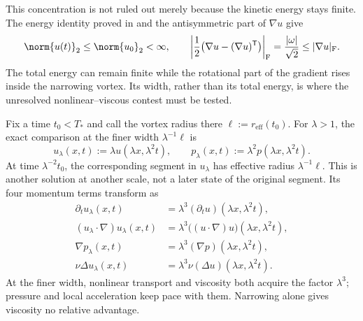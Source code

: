 This concentration is not ruled out merely because the kinetic energy stays finite. The energy identity proved in  and the antisymmetric part of \(\nabla u\) give
\[
  \norm{u(t)}_2
  \leq
  \norm{u_0}_2
  <\infty,
  \qquad
  \left|\frac12\bigl(\nabla u-(\nabla u)^{\mathsf T}\bigr)\right|_{\mathrm F}
  =
  \frac{|\omega|}{\sqrt2}
  \leq
  |\nabla u|_{\mathrm F}.
\]
The total energy can remain finite while the rotational part of the gradient rises inside the narrowing vortex. Its width, rather than its total energy, is where the unresolved nonlinear--viscous contest must be tested.


Fix a time \(t_0<T_*\) and call the vortex radius there \(\ell:=r_{\mathrm{eff}}(t_0)\). For \(\lambda>1\), the exact \NavierStokes{} comparison at the finer width \(\lambda^{-1}\ell\) is
\[
  u_\lambda(x,t)
  :=
  \lambda u(\lambda x,\lambda^2t),
  \qquad
  p_\lambda(x,t)
  :=
  \lambda^2p(\lambda x,\lambda^2t).
\]
At time \(\lambda^{-2}t_0\), the corresponding segment in \(u_\lambda\) has effective radius \(\lambda^{-1}\ell\). This is another solution at another scale, not a later state of the original segment. Its four momentum terms transform as
\[
\begin{aligned}
  \partial_tu_\lambda(x,t)
  &=
  \lambda^3(\partial_tu)(\lambda x,\lambda^2t),
  \\
  (u_\lambda\cdot\nabla)u_\lambda(x,t)
  &=
  \lambda^3\bigl((u\cdot\nabla)u\bigr)(\lambda x,\lambda^2t),
  \\
  \nabla p_\lambda(x,t)
  &=
  \lambda^3(\nabla p)(\lambda x,\lambda^2t),
  \\
  \nu\Delta u_\lambda(x,t)
  &=
  \lambda^3\nu(\Delta u)(\lambda x,\lambda^2t).
\end{aligned}
\]
At the finer width, nonlinear transport and viscosity both acquire the factor \(\lambda^3\); pressure and local acceleration keep pace with them. Narrowing alone gives viscosity no relative advantage.


